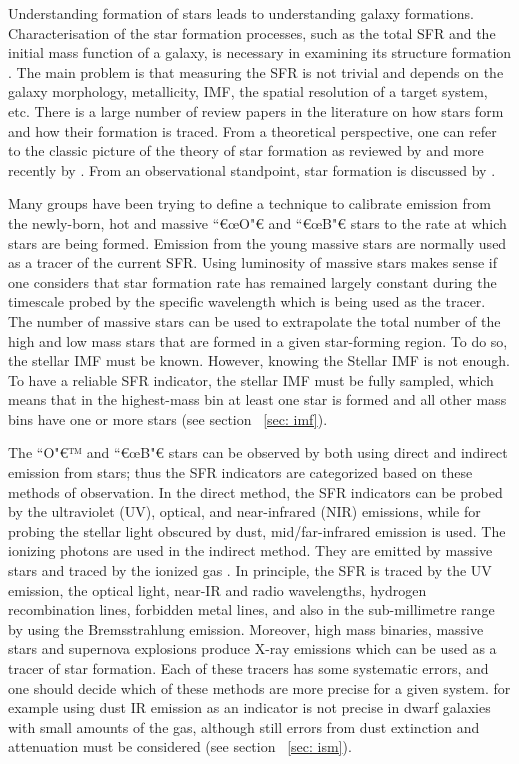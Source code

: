 Understanding formation of stars leads to understanding galaxy formations. Characterisation of the star formation processes, such as the total SFR and the initial mass function of a galaxy, is necessary in examining its structure formation \citep{McKee07}. The main problem is that measuring the SFR is not trivial and depends on the galaxy morphology, metallicity, IMF, the spatial resolution of a target system, etc. There is a large number of review papers in the literature on how stars form and how their formation is traced. From a theoretical perspective, one can refer to the classic picture of the theory of star formation as reviewed by \cite{Shu87} and more recently by \citep{McKee07}. From an observational standpoint, star formation is discussed by \cite{Kennicutt98b, Kewley02, Bell03, Calzetti07, Calzetti08, Calzetti10, Calzetti13, Kennicutt07, Kennicutt09, Boquien10, Hao11, Kennicutt12}.

Many groups have been trying to define a technique to calibrate emission from the newly-born, hot and massive ``€œO"€ and ``€œB"€ stars to the rate at which stars are being formed. Emission from the young massive stars are normally used as a tracer of the current SFR. Using luminosity of massive stars makes sense if one considers that star formation rate has remained largely constant during the timescale probed by the specific wavelength which is being used as the tracer. The number of massive stars can be used to extrapolate the total number of the high and low mass stars that are formed in a given star-forming region. To do so, the stellar IMF must be known. However, knowing the Stellar IMF is not enough. To have a reliable SFR indicator, the stellar IMF must be fully sampled, which means that in the highest-mass bin at least one star is formed and all other mass bins have one or more stars (see section ~\ref{sec: imf}).

The ``O"€™ and ``€œB"€ stars can be observed by both using direct and indirect emission from stars; thus the SFR indicators are categorized based on these methods of observation. In the direct method, the SFR indicators can be probed by the ultraviolet (UV), optical, and near-infrared (NIR) emissions, while for probing the stellar light obscured by dust, mid/far-infrared emission is used. The ionizing photons are used in the indirect method. They are emitted by massive stars and traced by the ionized gas \citep[e.g.,][]{Calzetti04, Calzetti07}. In principle, the SFR is traced by the UV emission, the optical light, near-IR and radio wavelengths, hydrogen recombination lines, forbidden metal lines, and also in the sub-millimetre range by using the Bremsstrahlung emission. Moreover, high mass binaries, massive stars and supernova explosions produce X-ray emissions which can be used as a tracer of star formation. Each of these tracers has some systematic errors, and one should decide which of these methods are more precise for a given system. for example using dust IR emission as an indicator is not precise in dwarf galaxies with small amounts of the gas, although still errors from dust extinction and attenuation must be considered (see section ~\ref{sec: ism}).



